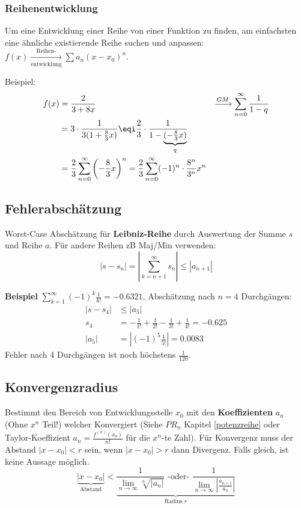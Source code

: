 \subsubsection{Reihenentwicklung}
Um eine Entwicklung einer Reihe von einer Funktion zu finden, am einfachsten eine ähnliche existierende Reihe suchen und anpassen: $f(x) \xrightarrow[\text{entwicklung}]{\text{Reihen-}} \sum a_n(x - x_0)^n$.

\noindent Beispiel:
\begin{align*}
	f(x) &= \frac{2}{3+8x} &\xrightarrow{GM} \sum_{n=0}^{\infty}\frac{1}{1-q} \\
	&= 3\cdot \frac{1}{3(1 + \tfrac{8}{3}x)} \eqi \frac{2}{3}\cdot \frac{1}{1 - \underbrace{(-\tfrac{8}{3}x)}_q} \\
	&= \frac{2}{3}\sum_{n=0}^{\infty}\left(-\frac{8}{3}x\right)^n = \frac{2}{3}\sum_{n=0}^{\infty}(-1)^n \cdot \frac{8^n}{3^n}x^n
\end{align*}

\subsection{Fehlerabschätzung}
Worst-Case Abschätzung für \textbf{Leibniz-Reihe} durch Auswertung der Summe $s$ und Reihe $a$. Für andere Reihen zB Maj/Min verwenden:
\[\left|s - s_n\right| = \left|\sum_{k=n+1}^{\infty}s_n\right| \leq \left|a_{n+1}\right|\]

\noindent \textbf{Beispiel} $\sum_{k=1}^{\infty}(-1)^k\frac{1}{k!} = -0.6321$, Abschätzung nach $n=4$ Durchgängen:
\begin{align*}
	\left|s - s_4\right| &\leq \left|a_5\right| \\
	s_4 &= -\frac{1}{1!} + \frac{1}{2!} -\frac{1}{3!} + \frac{1}{4!} = -0.625 \\
	\left|a_5\right| &= \left|(-1)^5\frac{1}{5!}\right| = 0.0083	
\end{align*}
Fehler nach 4 Durchgängen ist noch höchstens $\tfrac{1}{120}$.

\subsection{Konvergenzradius}
Bestimmt den Bereich von Entwicklungsstelle $x_0$ mit den \textbf{Koeffizienten} $a_n$ (Ohne $x^n$ Teil!) welcher Konvergiert (Siehe $PR_n$ Kapitel \ref{potenzreihe} oder Taylor-Koeffizient $a_n = \frac{f^{(n)}(x_0)}{n!}$ für die $x^n$-te Zahl). Für Konvergenz muss der Abstand $\left|x - x_0\right| < r$ sein, wenn $\left|x - x_0\right| > r$ dann Divergenz. Falls gleich, ist keine Aussage möglich. 
\[
\underbrace{\left|x - x_0\right|}_{\text{Abstand}} < \underbrace{\frac{1}{\lim\limits_{n \rightarrow \infty}\sqrt[n]{\left|a_n\right|}} \text{ -oder- } \frac{1}{\lim\limits_{n \rightarrow \infty}{\left|\frac{a_{n+1}}{a_n}\right|}}}_{\text{Radius } r}
\]

